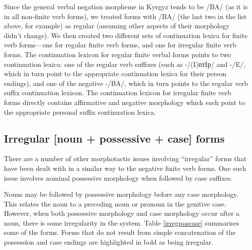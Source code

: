 \documentclass[10pt,a4paper,twocolumn]{article}
\begin{document}

Since the general verbal negation morpheme in Kyrgyz tends to be /BA/ (as it is in all non-finite verb forms), we treated forms with /BA/ (the last two in the list above, for example) as regular (assuming other aspects of their morphology didn’t change).  We then created two different sets of continuation lexica for finite verb forms—one for regular finite verb forms, and one for irregular finite verb forms.  The continuation lexicon for regular finite verbal forms points to two continuation lexica: one of the regular verb suffixes (such as -/(I)птIр/ and -/E/, which in turn point to the appropriate continuation lexica for their person endings), and one of the negative -/BA/, which in turn points to the regular verb suffix continuation lexicon.  The continuation lexicon for irregular finite verb forms directly contains affirmative and negative morphology which each point to the appropriate personal suffix continuation lexica.

\subsection{Irregular [noun + possessive + case] forms}

There are a number of other morphotactic issues involving ``irregular'' forms that have been dealt with in a similar way to the negative finite verb forms.  One such issue involves nominal possessive morphology when followed by case suffixes.

Nouns may be followed by possessive morphology before any case morphology.  This relates the noun to a preceding noun or pronoun in the genitive case.  However, when both possessive morphology and case morphology occur after a noun, there is some irregularity in the system.  Table \ref{irregposcase} summarises some of the forms.  Forms that do not result from simple concatenation of the possession and case endings are highlighted in bold as being irregular.
\end{document}
